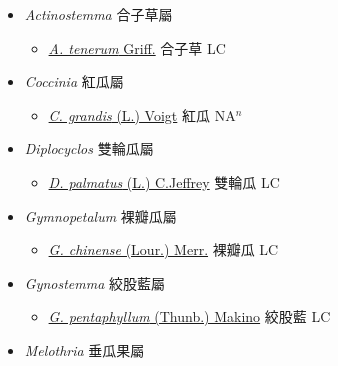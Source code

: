 
  \begin{itemize}
 \item[] \textit{Actinostemma} 合子草屬
                    
  \begin{itemize}
        \item[] \href{http://www.theplantlist.org/tpl1.1/search?q=Actinostemma+tenerum}{\textit{A. tenerum} Griff.}   合子草 LC
  \end{itemize}
 \item[] \textit{Coccinia} 紅瓜屬
                    
  \begin{itemize}
        \item[] \href{http://www.theplantlist.org/tpl1.1/search?q=Coccinia+grandis}{\textit{C. grandis} (L.) Voigt}   紅瓜 NA$^n$
  \end{itemize}
 \item[] \textit{Diplocyclos} 雙輪瓜屬
                    
  \begin{itemize}
        \item[] \href{http://www.theplantlist.org/tpl1.1/search?q=Diplocyclos+palmatus}{\textit{D. palmatus} (L.) C.Jeffrey}   雙輪瓜 LC
  \end{itemize}
 \item[] \textit{Gymnopetalum} 裸瓣瓜屬
                    
  \begin{itemize}
        \item[] \href{http://www.theplantlist.org/tpl1.1/search?q=Gymnopetalum+chinense}{\textit{G. chinense} (Lour.) Merr.}   裸瓣瓜 LC
  \end{itemize}
 \item[] \textit{Gynostemma} 絞股藍屬
                    
  \begin{itemize}
        \item[] \href{http://www.theplantlist.org/tpl1.1/search?q=Gynostemma+pentaphyllum}{\textit{G. pentaphyllum} (Thunb.) Makino}   絞股藍 LC
  \end{itemize}
 \item[] \textit{Melothria} 垂瓜果屬
                    

\end{itemize}
